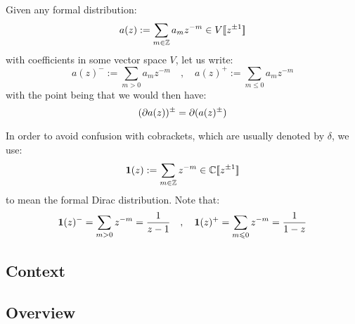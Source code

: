         \begin{convention}
            Given any formal distribution:
                $$a(z) := \sum_{m \in \mathbb{Z}} a_m z^{-m} \in V[\![z^{\pm 1}]\!]$$
            with coefficients in some vector space $V$, let us write:
                $$a(z)^- := \sum_{m > 0} a_m z^{-m} \quad, \quad a(z)^+ := \sum_{m \leq 0} a_m z^{-m}$$
            with the point being that we would then have:
                $$(\partial a(z))^{\pm} = \partial( a(z)^{\pm} )$$
        
            In order to avoid confusion with cobrackets, which are usually denoted by $\delta$, we use:
                $$\boldsymbol{ 1 }(z) := \sum_{m \in \mathbb{Z}} z^{-m} \in \mathbb{C}[\![z^{\pm 1}]\!]$$
            to mean the formal Dirac distribution. Note that:
                $$\boldsymbol{ 1 }(z)^- = \sum_{m > 0} z^{-m} = \frac{1}{z - 1} \quad, \quad \boldsymbol{ 1 }(z)^+ = \sum_{m \leqslant 0} z^{-m} = \frac{1}{1 - z}$$
        \end{convention}

    \subsection{Context}

    \subsection{Overview}